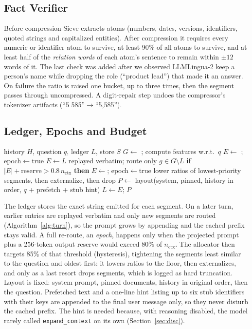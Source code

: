 \documentclass[journal]{IEEEtran}
\begin{document}
\subsection{Fact Verifier}
Before compression Sieve extracts atoms (numbers, dates, versions, identifiers, quoted strings and capitalized entities). After compression it
requires every numeric or identifier atom to survive, at least 90\% of all atoms to survive, and at least half of the \emph{relation words}
of each atom's sentence to remain within $\pm12$ words of it. The last check was added after we observed LLMLingua-2 keep a person's name while
dropping the role (``product lead'') that made it an answer. On failure the ratio is raised one bucket, up to three times, then the segment
passes through uncompressed. A digit-repair step undoes the compressor's tokenizer artifacts (``5 585''$\rightarrow$``5,585'').

\subsection{Ledger, Epochs and Budget}
\begin{algorithm}[t]\caption{Per-turn prompt assembly}\label{alg:turn}\small
\begin{algorithmic}[1]
\Require history $H$, question $q$, ledger $L$, store $S$
\State $G\gets$ ; compute features w.r.t.\ $q$
 \State $E\gets$ ; epoch$\gets$true
\Else \State $E\gets L$ replayed verbatim; route only $g\in G\setminus L$
\State \textbf{if} $|E|+\text{reserve}>0.8\,n_\text{ctx}$ \textbf{then} $E\gets$; epoch$\gets$true
\EndIf
{} \State lower ratios of lowest-priority segments, then externalize, then drop
\EndIf
\State $P\gets$ layout(system, pinned, history in order, $q$ + prefetch + stub hint)
\State $L\gets E$; \Return $P$
\end{algorithmic}\end{algorithm}
The ledger stores the exact string emitted for each segment. On a later turn, earlier entries are replayed verbatim and only new segments are
routed (Algorithm~\ref{alg:turn}), so the prompt grows by appending and the cached prefix stays valid. A full re-route, an \emph{epoch}, happens
only when the projected prompt plus a 256-token output reserve would exceed
80\% of $n_\text{ctx}$. The allocator then targets 85\% of that
threshold (hysteresis), tightening the segments least similar to the question and oldest first: it lowers ratios to the floor, then
externalizes, and only as a last resort drops segments, which is logged as hard truncation. Layout is fixed: system prompt, pinned documents,
history in original order, then the question. Prefetched text and a one-line hint listing up to six stub identifiers with their keys are
appended to the final user message only, so they never disturb the cached prefix. The hint is needed because, with reasoning disabled, the
model rarely called \texttt{expand\_context} on its own (Section~\ref{sec:disc}).
\end{document}
